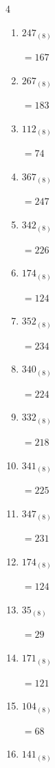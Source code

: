 \begin{multicols}{4}
\begin{enumerate}
        $=73$

  \item $247_{(8)}$

        $=167$

  \item $267_{(8)}$

        $=183$

\columnbreak %

\resetques

  \item $112_{(8)}$

        $=74$

  \item $367_{(8)}$

        $=247$

  \item $342_{(8)}$

        $=226$

  \item $174_{(8)}$

        $=124$

  \item $352_{(8)}$

        $=234$

  \item $340_{(8)}$

        $=224$

  \item $332_{(8)}$

        $=218$

  \item $341_{(8)}$

        $=225$

  \item $347_{(8)}$

        $=231$

  \item $174_{(8)}$

        $=124$

  \item $35_{(8)}$

        $=29$

  \item $171_{(8)}$

        $=121$

  \item $104_{(8)}$

        $=68$

  \item $141_{(8)}$


\end{enumerate}
\end{multicols}
